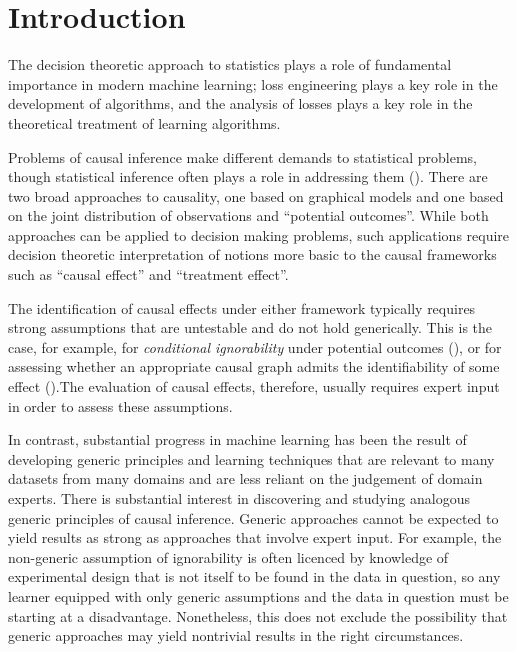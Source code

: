 \section{Introduction}

The decision theoretic approach to statistics plays a role of fundamental importance in modern machine learning; loss engineering plays a key role in the development of algorithms, and the analysis of losses plays a key role in the theoretical treatment of learning algorithms.

Problems of causal inference make different demands to statistical problems, though statistical inference often plays a role in addressing them (\cite{pearl_causality:_2009}). There are two broad approaches to causality, one based on graphical models and one based on the joint distribution of observations and ``potential outcomes''. While both approaches can be applied to decision making problems, such applications require decision theoretic interpretation of notions more basic to the causal frameworks such as ``causal effect'' and ``treatment effect''.

The identification of causal effects under either framework typically requires strong assumptions that are untestable and do not hold generically. This is the case, for example, for \emph{conditional ignorability} under potential outcomes (\cite{gordon_comparison_2018, heckman_randomization_1991}), or for assessing whether an appropriate causal graph admits the identifiability of some effect (\cite{tian2002general}).The evaluation of causal effects, therefore, usually requires expert input in order to assess these assumptions. 

In contrast, substantial progress in machine learning has been the result of developing generic principles and learning techniques that are relevant to many datasets from many domains and are less reliant on the judgement of domain experts. There is substantial interest in discovering and studying analogous generic principles of causal inference. Generic approaches cannot be expected to yield results as strong as approaches that involve expert input. For example, the non-generic assumption of ignorability is often licenced by knowledge of experimental design that is not itself to be found in the data in question, so any learner equipped with only generic assumptions and the data in question must be starting at a disadvantage. Nonetheless, this does not exclude the possibility that generic approaches may yield nontrivial results in the right circumstances.


